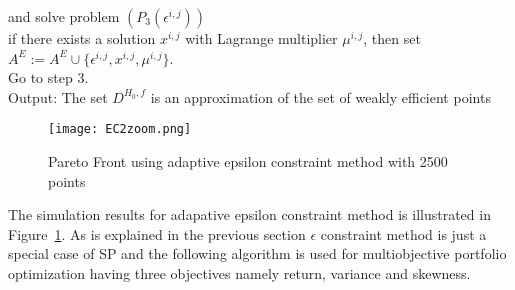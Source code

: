 \documentclass[12pt,a4paper]{article}
\numberwithin{equation}{section}
\begin{document}
\begin{algorithm}[H]
and solve problem $(P_{3}(\epsilon^{i,j}))$  \\
if there exists a solution $x^{i,j}$ with Lagrange multiplier $\mu^{i,j}$, then set $A^{E}:=A^{E} \cup \{ \epsilon^{i,j}, x^{i,j} , \mu^{i,j}  \}$. \\
Go to step 3. \\
Output: The set $D^{H_{0},f}$ is an approximation of the set of weakly efficient points 
\end{algorithm}
\begin{figure}[H]
  \texttt{[image: EC2zoom.png]}
  \caption{Pareto Front using adaptive epsilon constraint method with 2500 points}
  \label{fig:EC2zoom}
\end{figure}
The simulation results for adapative epsilon constraint method is illustrated in Figure~\ref{fig:EC2zoom}. As is explained in the previous section $\epsilon$ constraint method is just a special case of SP and the following algorithm is used for multiobjective portfolio optimization having three objectives namely return, variance and skewness.
\end{document}

